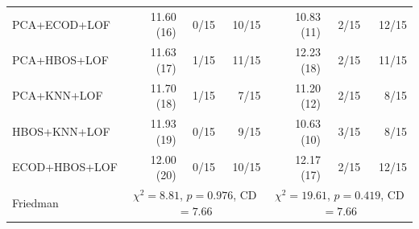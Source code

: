 \begin{table}[t]
\begin{tabular}{lrrrrrr}
PCA+ECOD+LOF & 11.60 (16) & 0/15 & 10/15 & 10.83 (11) & 2/15 & 12/15 \\
PCA+HBOS+LOF & 11.63 (17) & 1/15 & 11/15 & 12.23 (18) & 2/15 & 11/15 \\
PCA+KNN+LOF & 11.70 (18) & 1/15 & 7/15 & 11.20 (12) & 2/15 & 8/15 \\
HBOS+KNN+LOF & 11.93 (19) & 0/15 & 9/15 & 10.63 (10) & 3/15 & 8/15 \\
ECOD+HBOS+LOF & 12.00 (20) & 0/15 & 10/15 & 12.17 (17) & 2/15 & 12/15 \\
\midrule
Friedman & \multicolumn{3}{c}{$\chi^2 = 8.81$, $p = 0.976$, CD $= 7.66$} & \multicolumn{3}{c}{$\chi^2 = 19.61$, $p = 0.419$, CD $= 7.66$} \\
\bottomrule
\end{tabular}
\end{table}
